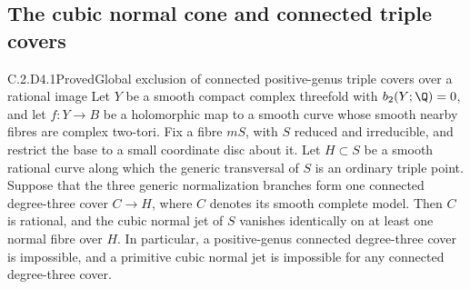 \subsection{The cubic normal cone and connected triple covers}

\begin{statement}{C.2.D4.1}{Proved}{Global exclusion of connected positive-genus triple covers over a rational image}
Let $Y$ be a smooth compact complex threefold with
$b_2(Y;\Q)=0$, and let $f:Y\to B$ be a holomorphic map to a
smooth curve whose smooth nearby fibres are complex two-tori.
Fix a fibre $mS$, with $S$ reduced and irreducible, and restrict
the base to a small coordinate disc about it. Let
$H\subset S$ be a smooth rational curve along which the generic
transversal of $S$ is an ordinary triple point. Suppose that the
three generic normalization branches form one connected degree-three
cover $C\to H$, where $C$ denotes its smooth complete model.
Then $C$ is rational, and the cubic normal jet of $S$ vanishes
identically on at least one normal fibre over $H$.
In particular, a positive-genus connected degree-three cover is
impossible, and a primitive cubic normal jet is impossible for
any connected degree-three cover.
\end{statement}
